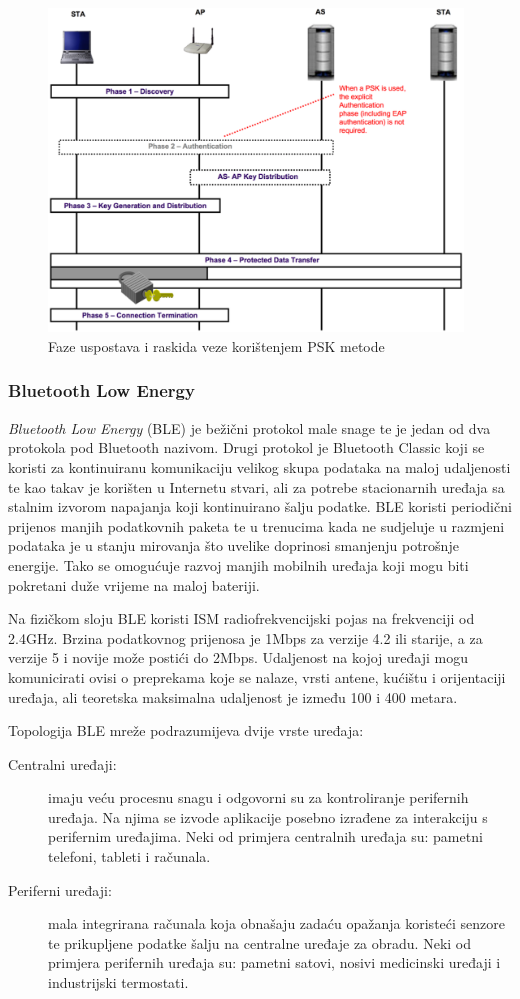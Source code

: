 \documentclass[times, utf8, diplomski]{fer}
\begin{document}
\begin{figure}[H]
    \centering
    \includegraphics[width=11cm]{images/psk.png}
    \caption{Faze uspostava i raskida veze korištenjem PSK metode\citep{NIST}}
    \label{fig:psk}
\end{figure}

\subsubsection{Bluetooth Low Energy}
\emph{Bluetooth Low Energy} (BLE) je bežični protokol male snage te je jedan od dva protokola pod Bluetooth nazivom. Drugi protokol je Bluetooth Classic koji se koristi za kontinuiranu komunikaciju velikog skupa podataka na maloj udaljenosti te kao takav je korišten u Internetu stvari, ali za potrebe stacionarnih uređaja sa stalnim izvorom napajanja koji kontinuirano šalju podatke. BLE koristi periodični prijenos manjih podatkovnih paketa te u trenucima kada ne sudjeluje u razmjeni podataka je u stanju mirovanja što uvelike doprinosi smanjenju potrošnje energije. Tako se omogućuje razvoj manjih mobilnih uređaja koji mogu biti pokretani duže vrijeme na maloj bateriji. 

Na fizičkom sloju BLE koristi ISM  radiofrekvencijski pojas na frekvenciji od 2.4GHz. Brzina podatkovnog prijenosa je 1Mbps za verzije 4.2 ili starije, a za verzije 5 i novije može postići do 2Mbps. Udaljenost na kojoj uređaji mogu komunicirati ovisi o preprekama koje se nalaze, vrsti antene, kućištu i orijentaciji uređaja, ali teoretska maksimalna udaljenost je između 100 i 400 metara.

Topologija BLE mreže podrazumijeva dvije vrste uređaja:
\begin{description}
    \item[Centralni uređaji:]imaju veću procesnu snagu i odgovorni su za kontroliranje perifernih uređaja. Na njima se izvode aplikacije posebno izrađene za interakciju s perifernim uređajima. Neki od primjera centralnih uređaja su: pametni telefoni, tableti i računala. 
    \item[Periferni uređaji:]mala integrirana računala koja obnašaju zadaću opažanja koristeći senzore te prikupljene podatke šalju na centralne uređaje za obradu. Neki od primjera perifernih uređaja su: pametni satovi, nosivi medicinski uređaji i industrijski termostati.
\end{description}
\end{document}
